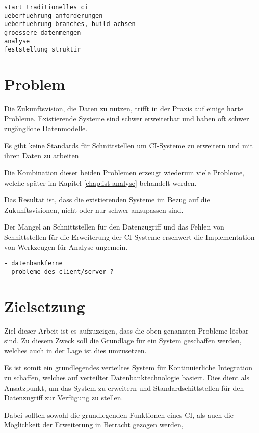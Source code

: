 

\begin{verbatim}
start traditionelles ci
ueberfuehrung anforderungen
ueberfuehrung branches, build achsen
groessere datenmengen
analyse
feststellung struktir
\end{verbatim}



\section{Problem}

Die Zukunftsvision, die Daten zu nutzen,
trifft in der Praxis auf einige harte Probleme.
Existierende Systeme sind schwer erweiterbar und haben oft schwer zugängliche Datenmodelle.

Es gibt keine Standards für Schnittstellen um CI-Systeme zu erweitern und mit ihren Daten zu arbeiten

Die Kombination dieser beiden Problemen erzeugt wiederum viele Probleme,
welche später im Kapitel \ref{chap:ist-analyse} behandelt werden.

Das Resultat ist, dass die existierenden Systeme im Bezug auf die Zukunftsvisionen,
nicht oder nur schwer anzupassen sind.

Der Mangel an Schnittstellen für den Datenzugriff und
das Fehlen von Schnittstellen für die Erweiterung der CI-Systeme
erschwert die Implementation von Werkzeugen für Analyse ungemein.


\begin{verbatim}
- datenbankferne
- probleme des client/server ?
\end{verbatim}

\section{Zielsetzung}
Ziel dieser Arbeit ist es  aufzuzeigen, dass die oben genannten Probleme lösbar sind.
Zu diesem Zweck soll die Grundlage für ein System geschaffen werden,
welches auch in der Lage ist dies umzusetzen.

Es ist somit ein grundlegendes verteiltes System f\"ur Kontinuierliche Integration zu schaffen,
welches auf verteilter Datenbanktechnologie basiert.
Dies dient als Ansatzpunkt, um das System zu erweitern und
Standardschittstellen f\"ur den Datenzugriff zur Verf\"ugung zu stellen.

Dabei sollten sowohl die grundlegenden Funktionen eines CI,
als auch die M\"oglichkeit der Erweiterung in Betracht gezogen werden,

